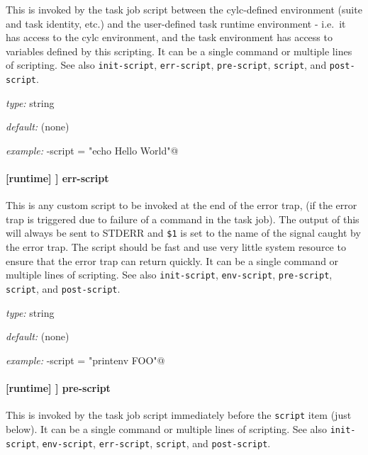 This is invoked by the task job script between the cylc-defined environment
(suite and task identity, etc.) and the user-defined task runtime environment -
i.e.\ it has access to the cylc environment, and the task environment has
access to variables defined by this scripting. It can be a single command or
multiple lines of scripting.  See also \lstinline=init-script=,
\lstinline=err-script=, \lstinline=pre-script=, \lstinline=script=, and
\lstinline=post-script=.

\begin{myitemize}
\item {\em type:} string
\item {\em default:} (none)
\item {\em example:} \lstinline@env-script = "echo Hello World"@
\end{myitemize}

\paragraph[err-script]{[runtime] \textrightarrow [[\_\_NAME\_\_]] \textrightarrow err-script}

This is any custom script to be invoked at the end of the error trap, (if the
error trap is triggered due to failure of a command in the task job). The
output of this will always be sent to STDERR and \lstinline=$1= is set to the
name of the signal caught by the error trap. The script should be fast and use
very little system resource to ensure that the error trap can return quickly.
It can be a single command or multiple lines of scripting. See also
\lstinline=init-script=, \lstinline=env-script=, \lstinline=pre-script=,
\lstinline=script=, and \lstinline=post-script=.

\begin{myitemize}
\item {\em type:} string
\item {\em default:} (none)
\item {\em example:} \lstinline@err-script = "printenv FOO"@
\end{myitemize}

\paragraph[pre-script]{ [runtime] \textrightarrow [[\_\_NAME\_\_]] \textrightarrow pre-script}

This is invoked by the task job script immediately before the \lstinline=script=
item (just below). It can be a single command or multiple lines of scripting.
See also \lstinline=init-script=, \lstinline=env-script=, \lstinline=err-script=,
\lstinline=script=, and \lstinline=post-script=.

